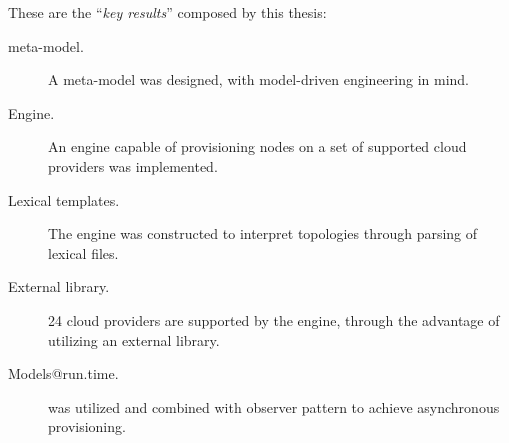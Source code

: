 These are the ``\emph{key results}'' composed by this thesis:
\begin{description}
  \item[meta-model.]
    A meta-model was designed, with model-driven engineering in mind.
  \item[Engine.]
    An engine capable of provisioning nodes on a set of supported cloud providers
    was implemented.
  \item[Lexical templates.]
    The engine was constructed to interpret topologies through parsing of lexical files.
  \item[External library.]
    24 cloud providers are supported by the engine, through the advantage of 
    utilizing an external library.
  \item[Models@run.time.]
     was utilized and combined with observer pattern to
    achieve asynchronous provisioning.
\end{description}
